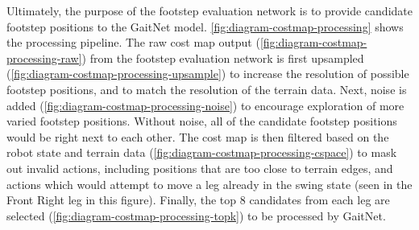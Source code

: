 Ultimately, the purpose of the footstep evaluation network is to
provide candidate footstep positions to the GaitNet model.
\autoref{fig:diagram-costmap-processing} shows the processing pipeline.
The raw cost map output (\autoref{fig:diagram-costmap-processing-raw})
from the footstep evaluation network is first upsampled
(\autoref{fig:diagram-costmap-processing-upsample}) to increase the
resolution of possible footstep positions, and to match the resolution of
the terrain data. Next, noise is added
(\autoref{fig:diagram-costmap-processing-noise}) to
encourage exploration of more varied footstep positions. Without noise,
all of the candidate footstep positions would be right next to each other.
The cost map is then filtered based on the robot state and terrain data
(\autoref{fig:diagram-costmap-processing-cspace}) to mask out
invalid actions, including positions that are too close to terrain edges,
and actions which would attempt to move a leg already in the swing state
(seen in the Front Right leg in this figure). Finally, the top 8
candidates from each leg are selected
(\autoref{fig:diagram-costmap-processing-topk})
to be processed by GaitNet.

\def\imgwidth{0.16\textwidth}
\def\xgap{2em}          %
\def\arrowwidth{1.2em}  %
\def\arrowshift{0.5em} %

